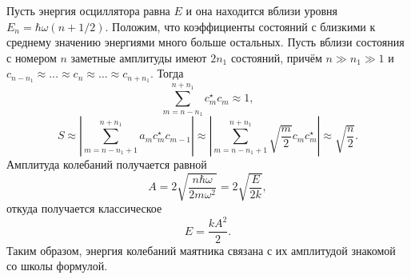 \documentclass{ncc}
\begin{document}
Пусть энергия осциллятора равна \( E \) и она находится вблизи уровня \( E_n = \hbar\omega(n+1/2) \). Положим, что коэффициенты состояний с близкими к среднему значению энергиями много больше остальных. Пусть вблизи состояния с номером \( n \) заметные амплитуды имеют \( 2n_1 \) состояний, причём \( n \gg n_1 \gg 1 \) и \( c_{n-n_1} \approx \ldots \approx c_n \approx \ldots \approx c_{n+n_1} \). Тогда
\[
    \sum_{m=n-n_1}^{n+n_1} c_m^\star  c_{m} \approx 1,
\]
\[
    S \approx \left|\sum_{m=n-n_1+1}^{n+n_1} a_m c_m^\star  c_{m-1}\right| \approx \left|\sum_{m=n-n_1+1}^{n+n_1} \sqrt{\frac{m}{2}}c_m c_m^\star \right| \approx \sqrt{\frac{n}{2}}.
\]
Амплитуда колебаний получается равной
\[
    A = 2\sqrt{\frac{n\hbar\omega}{2m\omega^2}} = 2\sqrt{\frac{E}{2k}},
\]
откуда получается классическое
\[
    E = \frac{kA^2}{2}.
\]
Таким образом, энергия колебаний маятника связана с их амплитудой знакомой со школы формулой.
\end{document}

